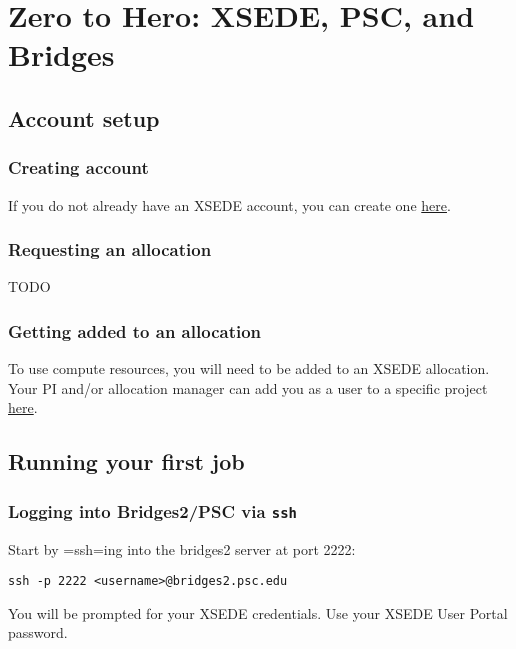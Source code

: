 \documentclass[11pt]{article}
\author{Ian Waudby-Smith}
\date{\today}
\title{}
\begin{document}
\tableofcontents

\section{Zero to Hero: XSEDE, PSC, and Bridges}
\label{zero-to-hero-xsede-psc-and-bridges}
\subsection{Account setup}
\label{account-setup}
\subsubsection{Creating account}
\label{creating-account}
If you do not already have an XSEDE account, you can create one
\href{https://portal.xsede.org/my-xsede?p\_p\_id=58\&p\_p\_lifecycle=0\&p\_p\_state=maximized\&p\_p\_mode=view\&\_58\_struts\_action=\%2Flogin\%2Fcreate\_account}{here}.

\subsubsection{Requesting an allocation}
\label{requesting-an-allocation}
TODO

\subsubsection{Getting added to an allocation}
\label{getting-added-to-an-allocation}
To use compute resources, you will need to be added to an XSEDE
allocation. Your PI and/or allocation manager can add you as a user to a
specific project
\href{https://portal.xsede.org/group/xup/add-remove-user}{here}.

\subsection{Running your first job}
\label{running-your-first-job}
\subsubsection{Logging into Bridges2/PSC via \texttt{ssh}}
\label{logging-into-bridges2psc-via-ssh}
Start by =ssh=ing into the bridges2 server at port 2222:

\begin{verbatim}
ssh -p 2222 <username>@bridges2.psc.edu
\end{verbatim}

You will be prompted for your XSEDE credentials. Use your XSEDE User
Portal password.
\end{document}
